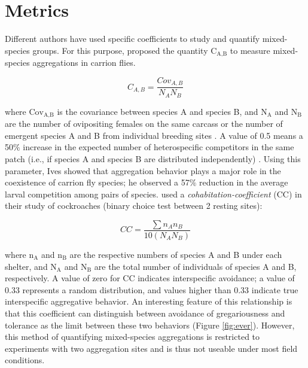 	\section{Metrics}
Different authors have used specific coefficients to study and quantify mixed-species groups. For this purpose, \citet{ives_aggregation_1991} proposed the quantity $\text{C}_{\text{A,B}}$ to measure mixed-species aggregations in carrion flies. 

\begin{equation}
	\label{equation1}
		C_{A,B}= \frac{Cov_{A,B}}{N_{A}N_{B}}  
\end{equation}

where $\text{Cov}_{\text{A,B}}$ is the covariance between species A and species B, and $\text{N}_{\text{A}}$ and $\text{N}_{\text{B}}$ are the number of ovipositing females on the same carcass or the number of emergent species A and B from individual breeding sites \cite{jaenike_aggregation_1991}. A value of 0.5 means a 50$\%$ increase in the expected number of heterospecific competitors in the same patch (i.e., if species A and species B are distributed independently) \cite{ives_aggregation_1991}. Using this parameter, Ives showed that aggregation behavior plays a major role in the coexistence of carrion fly species; he observed a 57$\%$ reduction in the average larval competition among pairs of species.
\citet{everaerts_changes_1997} used a \textit{cohabitation-coefficient} (CC) in their study of cockroaches (binary choice test between 2 resting sites):

\begin{equation}
	\label{equation2}
		CC= \frac{\sum n_{A}n_{B}}{10(N_{A}N_{B})}  
\end{equation}

where $\text{n}_{\text{A}}$ and $\text{n}_{\text{B}}$ are the respective numbers of species A and B under each shelter, and $\text{N}_{\text{A}}$ and $\text{N}_{\text{B}}$ are the total number of individuals of species A and B, respectively. A value of zero for CC indicates interspecific avoidance; a value of 0.33 represents a random distribution, and values higher than 0.33 indicate true interspecific aggregative behavior. An interesting feature of this relationship is that this coefficient can distinguish between avoidance of gregariousness and tolerance as the limit between these two behaviors (Figure \ref{fig:ever}). However, this method of quantifying mixed-species aggregations is restricted to experiments with two aggregation sites and is thus not useable under most field conditions.

